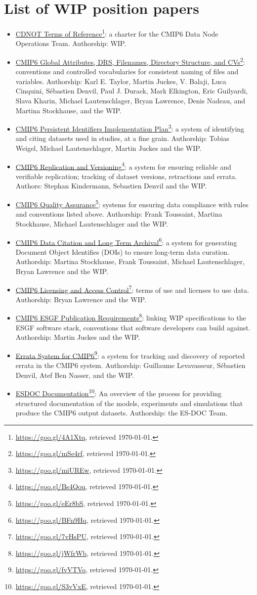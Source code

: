 \documentclass[gmd,manuscript]{copernicus}
\newcommand{\urlref}[2] {\href{#1}{#2}\footnote{\url{#1}, retrieved \today.}}
\begin{document}
\appendix

\section{List of WIP position papers}
\label{sec:wip}


\begin{itemize}
\item \urlref{https://goo.gl/4A1Xtq}{CDNOT Terms of Reference}: a
  charter for the CMIP6 Data Node Operations Team. Authorship: WIP.
\item \urlref{https://goo.gl/mSe4rf}{CMIP6 Global Attributes, DRS,
    Filenames, Directory Structure, and CVs}: conventions and
  controlled vocabularies for consistent naming of files and
  variables. Authorship: Karl E. Taylor, Martin Juckes, V. Balaji,
  Luca Cinquini, Sébastien Denvil, Paul J. Durack, Mark Elkington,
  Eric Guilyardi, Slava Kharin, Michael Lautenschlager, Bryan
  Lawrence, Denis Nadeau, and Martina Stockhause, and the WIP.
\item \urlref{https://goo.gl/miUREw}{CMIP6 Persistent Identifiers
    Implementation Plan}: a system of identifying and citing datasets
  used in studies, at a fine grain. Authorship: Tobias Weigel, Michael
  Lautenschlager, Martin Juckes and the WIP.
\item \urlref{https://goo.gl/Bs4Qou}{CMIP6 Replication and Versioning}:
  a system for ensuring reliable and verifiable replication; tracking
  of dataset versions, retractions and errata. Authors: Stephan
  Kindermann, Sebastien Denvil and the WIP.
\item \urlref{https://goo.gl/eEr8bS}{CMIP6 Quality Assurance}: systems
  for ensuring data compliance with rules and conventions listed
  above. Authorship: Frank Toussaint, Martina Stockhause, Michael
  Lautenschlager and the WIP.
\item \urlref{https://goo.gl/BFn9Hq}{CMIP6 Data Citation and Long Term
    Archival}: a system for generating Document Object Identifies
  (DOIs) to ensure long-term data curation. Authorship: Martina
  Stockhause, Frank Toussaint, Michael Lautenschlager, Bryan Lawrence
  and the WIP.
\item \urlref{https://goo.gl/7vHsPU}{CMIP6 Licensing and Access
    Control}: terms of use and licenses to use data. Authorship: Bryan
  Lawrence and the WIP.
\item \urlref{https://goo.gl/jWfrWb}{CMIP6 ESGF Publication
    Requirements}: linking WIP specifications to the ESGF software
  stack, conventions that software developers can build against.
  Authorship: Martin Juckes and the WIP.
\item \urlref{https://goo.gl/fvVTVo}{Errata System for CMIP6}: a system
  for tracking and discovery of reported errata in the CMIP6 system.
  Authorship: Guillaume Levavasseur, Sébastien Denvil, Atef Ben
  Nasser, and the WIP.
\item \urlref{https://goo.gl/S3vVxE}{ESDOC Documentation}: An overview
  of the process for providing structured documentation of the models,
  experiments and simulations that produce the CMIP6 output datasets.
  Authorship: the ES-DOC Team.
\end{itemize}
\end{document}
